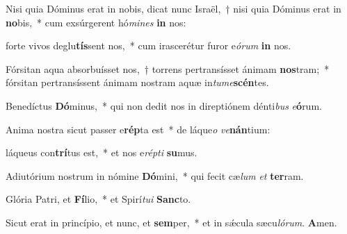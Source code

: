 \item Nisi quia Dóminus erat in nobis, dicat nunc Israël,~† nisi quia Dóminus erat in \textbf{no}bis,~* cum exsúrgerent hó\textit{mines} \textbf{in} nos:

\item forte vivos deglu\textbf{tís}sent nos,~* cum irascerétur furor e\textit{órum} \textbf{in} nos.

\item Fórsitan aqua absorbuísset nos,~† torrens pertransísset ánimam \textbf{nos}tram;~* fórsitan pertransíssent ánimam nostram aquæ in\textit{tume}\textbf{scén}tes.

\item Benedíctus \textbf{Dó}minus,~* qui non dedit nos in direptiónem dénti\textit{bus} \textit{e}\textbf{ó}rum.

\item Anima nostra sicut passer e\textbf{rép}ta est~* de láque\textit{o} \textit{ve}\textbf{nán}tium:

\item láqueus con\textbf{trí}tus est,~* et nos e\textit{répti} \textbf{su}mus.

\item Adiutórium nostrum in nómine \textbf{Dó}mini,~* qui fecit cæ\textit{lum} \textit{et} \textbf{ter}ram.

\item Glória Patri, et \textbf{Fí}lio,~* et Spirí\textit{tui} \textbf{Sanc}to.

\item Sicut erat in princípio, et nunc, et \textbf{sem}per,~* et in sǽcula sæcu\textit{lórum}. \textbf{A}men.